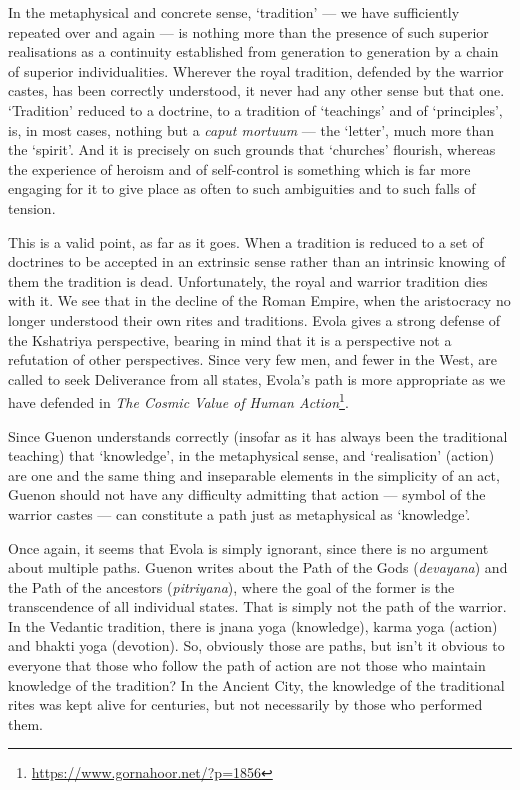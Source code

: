 \begin{quotex}
In the metaphysical and concrete sense, `tradition' --- we have sufficiently repeated over and again --- is nothing more than the presence of such superior realisations as a continuity established from generation to generation by a chain of superior individualities. Wherever the royal tradition, defended by the warrior castes, has been correctly understood, it never had any other sense but that one. `Tradition' reduced to a doctrine, to a tradition of `teachings' and of `principles', is, in most cases, nothing but a \emph{caput mortuum} --- the `letter', much more than the `spirit'. And it is precisely on such grounds that `churches' flourish, whereas the experience of heroism and of self-control is something which is far more engaging for it to give place as often to such ambiguities and to such falls of tension.
\end{quotex}


This is a valid point, as far as it goes. When a tradition is reduced to a set of doctrines to be accepted in an extrinsic sense rather than an intrinsic knowing of them the tradition is dead. Unfortunately, the royal and warrior tradition dies with it. We see that in the decline of the Roman Empire, when the aristocracy no longer understood their own rites and traditions. Evola gives a strong defense of the Kshatriya perspective, bearing in mind that it is a perspective not a refutation of other perspectives. Since very few men, and fewer in the West, are called to seek Deliverance from all states, Evola's path is more appropriate as we have defended in \textit{The Cosmic Value of Human Action}\footnote{\url{https://www.gornahoor.net/?p=1856}}.

\begin{quotex}
Since Guenon understands correctly (insofar as it has always been the traditional teaching) that `knowledge', in the metaphysical sense, and `realisation' (action) are one and the same thing and inseparable elements in the simplicity of an act, Guenon should not have any difficulty admitting that action --- symbol of the warrior castes --- can constitute a path just as metaphysical as `knowledge'.
\end{quotex}


Once again, it seems that Evola is simply ignorant, since there is no argument about multiple paths. Guenon writes about the Path of the Gods (\emph{devayana}) and the Path of the ancestors (\emph{pitriyana}), where the goal of the former is the transcendence of all individual states. That is simply not the path of the warrior. In the Vedantic tradition, there is jnana yoga (knowledge), karma yoga (action) and bhakti yoga (devotion). So, obviously those are paths, but isn't it obvious to everyone that those who follow the path of action are not those who maintain knowledge of the tradition? In the Ancient City, the knowledge of the traditional rites was kept alive for centuries, but not necessarily by those who performed them.

